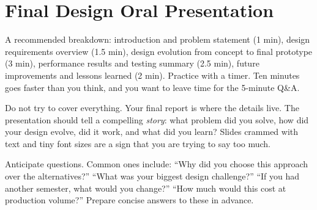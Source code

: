 \section{Final Design Oral Presentation}

\begin{faqbox}
A recommended breakdown: introduction and problem statement (1 min), design requirements overview (1.5 min), design evolution from concept to final prototype (3 min), performance results and testing summary (2.5 min), future improvements and lessons learned (2 min). Practice with a timer. Ten minutes goes faster than you think, and you want to leave time for the 5-minute Q\&A.
\end{faqbox}

\begin{warnbox}
Do not try to cover everything. Your final report is where the details live. The presentation should tell a compelling \textit{story}: what problem did you solve, how did your design evolve, did it work, and what did you learn? Slides crammed with text and tiny font sizes are a sign that you are trying to say too much.
\end{warnbox}

\begin{protip}
Anticipate questions. Common ones include: ``Why did you choose this approach over the alternatives?'' ``What was your biggest design challenge?'' ``If you had another semester, what would you change?'' ``How much would this cost at production volume?'' Prepare concise answers to these in advance.
\end{protip}

